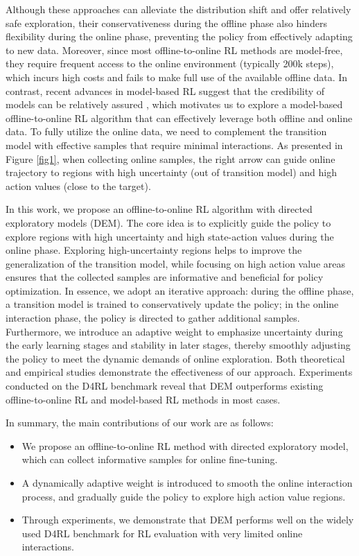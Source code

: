 \documentclass[letterpaper]{article} %
\begin{document}
Although these approaches can alleviate the distribution shift and offer relatively safe exploration, their conservativeness during the offline phase also hinders flexibility during the online phase, preventing the policy from effectively adapting to new data. Moreover, since most offline-to-online RL methods are model-free, they require frequent access to the online environment (typically 200k steps), which incurs high costs and fails to make full use of the available offline data. In contrast, recent advances in model-based RL suggest that the credibility of models can be relatively assured \cite{mopo,rambo,combo,yang2023model,sun2024conformal}, which motivates us to explore a model-based offline-to-online RL algorithm that can effectively leverage both offline and online data. To fully utilize the online data, we need to complement the transition model with effective samples that require minimal interactions. As presented in Figure \ref{fig1}, when collecting online samples, the right arrow can guide online trajectory to regions with high uncertainty (out of transition model) and high action values (close to the target).

In this work, we propose an offline-to-online RL algorithm with directed exploratory models (DEM). The core idea is to explicitly guide the policy to explore regions with high uncertainty and high state-action values during the online phase. Exploring high-uncertainty regions helps to improve the generalization of the transition model, while focusing on high action value areas ensures that the collected samples are informative and beneficial for policy optimization. In essence, we adopt an iterative approach: during the offline phase, a transition model is trained to conservatively update the policy; in the online interaction phase, the policy is directed to gather additional samples. Furthermore, we introduce an adaptive weight to emphasize uncertainty during the early learning stages and stability in later stages, thereby smoothly adjusting the policy to meet the dynamic demands of online exploration. Both theoretical and empirical studies demonstrate the effectiveness of our approach. Experiments conducted on the D4RL benchmark \cite{d4rl} reveal that DEM outperforms existing offline-to-online RL and model-based RL methods in most cases.

In summary, the main contributions of our work are as follows:
\begin{itemize}
\item We propose an offline-to-online RL method with directed exploratory model, which can collect informative samples for online fine-tuning.
\item A dynamically adaptive weight is introduced to smooth the online interaction process, and gradually guide the policy to explore high action value regions.
\item Through experiments, we demonstrate that DEM performs well on the widely used D4RL benchmark for RL evaluation with very limited online interactions.
\end{itemize}
\end{document}
